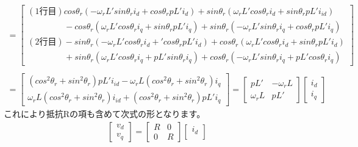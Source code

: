 \begin{fleqn}[8pt]
{\large
\begin{align*}
    =
    \begin{bmatrix}
    (1行目)cos\theta_{r}(-\omega_{r} L'sin\theta_{r}i_{d} + cos\theta_{r}pL'i_{d}) + sin\theta_{r}(\omega_{r} L'cos\theta_{r}i_{d} + sin\theta_{r}pL'i_{id}) \\
    \;\qquad \qquad -cos\theta_{r}(\omega_{r} L'cos\theta_{r}i_{q}+sin\theta_{r}pL'i_{q}) + sin\theta_{r}(-\omega_{r} L'sin\theta_{r}i_{q} + cos\theta_{r}pL'i_{q}) \\
    (2行目)-sin\theta_{r}(-\omega_{r} L'cos\theta_{r}i_{d} + 'cos\theta_{r}pL'i_{d}) + cos\theta_{r}(\omega_{r} L'cos\theta_{r}i_{d} + sin\theta_{r}pL'i_{d}) \\
    \;\qquad \qquad+ sin\theta_{r}(\omega_{r} L'cos\theta_{r}i_{q} + pL'sin\theta_{r}i_{q}) + cos\theta_{r}(-\omega_{r} L'sin\theta_{r}i_{q} + pL'cos\theta_{r}i_{q})
    \end{bmatrix}
\end{align*}
\begin{align*}
    \\
    =
    \begin{bmatrix}
    (cos^{2}\theta_{r} + sin^{2}\theta_{r})pL'i_{id} - \omega_{r} L(cos^{2}\theta_{r} + sin^{2}\theta_{r})i_{q} \\
    \omega_{r} L(cos^{2}\theta_{r} + sin^{2}\theta_{r})i_{id} + (cos^{2}\theta_{r} + sin^{2}\theta_{r})pL'i_{q}
    \end{bmatrix}
    =
    \begin{bmatrix}
    pL' & - \omega_{r} L \\
    \omega_{r} L & pL'
    \end{bmatrix}
    \begin{bmatrix}
        i_{d} \\
        i_{q}
    \end{bmatrix}
\end{align*}
}
これにより抵抗Rの項も含めて次式の形となります。
{\large
\begin{align*}
    \begin{bmatrix}
        v_{d} \\
        v_{q}
    \end{bmatrix}
    =
    \begin{bmatrix}
        R & 0 \\
        0 & R
    \end{bmatrix}
    \begin{bmatrix}
        i_{d} \\

\end{bmatrix}
\end{align*}}
\end{fleqn}
